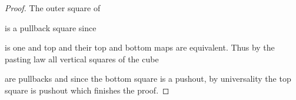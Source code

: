 \begin{lemma}
\begin{proof}
        The outer square of 
        \begin{center}
        \end{center}
        is a pullback square since 
        \begin{center}
        \end{center}
        is one and top and their top and bottom maps are equivalent.
        Thus by the pasting law all vertical squares of the cube
        \begin{center}
        \end{center}
        are pullbacks and since the bottom square is a pushout, by universality the top square is pushout which finishes the proof.
    \end{proof}
\end{lemma}
